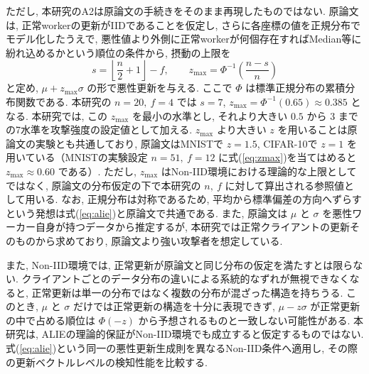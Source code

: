 \documentclass[a4j, twocolumn, dvipdfmx]{jsarticle}
\begin{document}
ただし, 本研究のA2は原論文の手続きをそのまま再現したものではない. 原論文は, 正常workerの更新がIIDであることを仮定し, さらに各座標の値を正規分布でモデル化したうえで, 悪性値より外側に正常workerが何個存在すればMedian等に紛れ込めるかという順位の条件から, 摂動の上限を
\begin{equation}
s = \left\lfloor \frac{n}{2} + 1 \right\rfloor - f, \qquad
z_{\max} = \Phi^{-1}\!\left(\frac{n-s}{n}\right)
\label{eq:zmax}
\end{equation}
と定め, $\mu + z_{\max}\sigma$ の形で悪性更新を与える. ここで $\Phi$ は標準正規分布の累積分布関数である. 本研究の $n=20,\ f=4$ では $s=7$, $z_{\max} = \Phi^{-1}(0.65) \approx 0.385$ となる. 本研究では, この $z_{\max}$ を最小の水準とし, それより大きい $0.5$ から $3$ までの7水準を攻撃強度の設定値として加える. $z_{\max}$ より大きい $z$ を用いることは原論文の実験とも共通しており, 原論文はMNISTで $z=1.5$, CIFAR-10で $z=1$ を用いている（MNISTの実験設定 $n=51,\ f=12$ に式(\ref{eq:zmax})を当てはめると $z_{\max} \approx 0.60$ である）. ただし, $z_{\max}$ はNon-IID環境における理論的な上限としてではなく, 原論文の分布仮定の下で本研究の $n,\ f$ に対して算出される参照値として用いる. なお, 正規分布は対称であるため, 平均から標準偏差の方向へずらすという発想は式(\ref{eq:alie})と原論文で共通である. また, 原論文は $\mu$ と $\sigma$ を悪性ワーカー自身が持つデータから推定するが, 本研究では正常クライアントの更新そのものから求めており, 原論文より強い攻撃者を想定している.

また, Non-IID環境では, 正常更新が原論文と同じ分布の仮定を満たすとは限らない. クライアントごとのデータ分布の違いによる系統的なずれが無視できなくなると, 正常更新は単一の分布ではなく複数の分布が混ざった構造を持ちうる. このとき, $\mu$ と $\sigma$ だけでは正常更新の構造を十分に表現できず, $\mu - z\sigma$ が正常更新の中で占める順位は $\Phi(-z)$ から予想されるものと一致しない可能性がある. 本研究は, ALIEの理論的保証がNon-IID環境でも成立すると仮定するものではない. 式(\ref{eq:alie})という同一の悪性更新生成則を異なるNon-IID条件へ適用し, その際の更新ベクトルレベルの検知性能を比較する.
\end{document}

